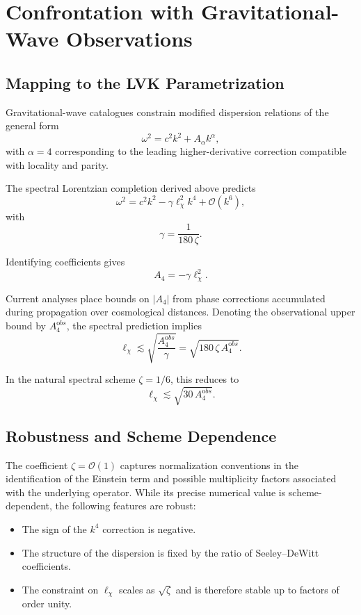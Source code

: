\section{Confrontation with Gravitational-Wave Observations}
  \label{sec:gw_constraints}

  \subsection{Mapping to the LVK Parametrization}
    \label{subsec:mapping-to-the-lvk-parametrization}

    Gravitational-wave catalogues constrain modified dispersion relations
    of the general form
    \[
      \omega^2 = c^2 k^2 + A_\alpha k^\alpha,
    \]
    with $\alpha=4$ corresponding to the leading higher-derivative
    correction compatible with locality and parity.

    The spectral Lorentzian completion derived above predicts
    \[
      \omega^2 = c^2 k^2 - \gamma \ell_\chi^2 k^4 + \mathcal{O}(k^6),
    \]
    with
    \[
      \gamma = \frac{1}{180\,\zeta}.
    \]

    Identifying coefficients gives
    \[
      A_4 = -\gamma \ell_\chi^2.
    \]

    Current analyses place bounds on $|A_4|$ from phase corrections
    accumulated during propagation over cosmological distances.
    Denoting the observational upper bound by $A_4^{\mathrm obs}$,
    the spectral prediction implies
    \[
      \ell_\chi \lesssim \sqrt{\frac{A_4^{\mathrm obs}}{\gamma}} = \sqrt{180\,\zeta\,A_4^{\mathrm obs}}.
    \]

    In the natural spectral scheme $\zeta=1/6$,
    this reduces to
    \[
      \ell_\chi \lesssim \sqrt{30\,A_4^{\mathrm obs}}.
    \]

  \subsection{Robustness and Scheme Dependence}
    \label{subsec:robustness-and-scheme-dependence}

    The coefficient $\zeta=\mathcal{O}(1)$ captures normalization
    conventions in the identification of the Einstein term and possible
    multiplicity factors associated with the underlying operator.
    While its precise numerical value is scheme-dependent,
    the following features are robust:

    \begin{itemize}
      \item The sign of the $k^4$ correction is negative.
      \item The structure of the dispersion is fixed by the ratio of Seeley--DeWitt coefficients.
      \item The constraint on $\ell_\chi$ scales as $\sqrt{\zeta}$ and is therefore stable up to factors of order unity.
    \end{itemize}

